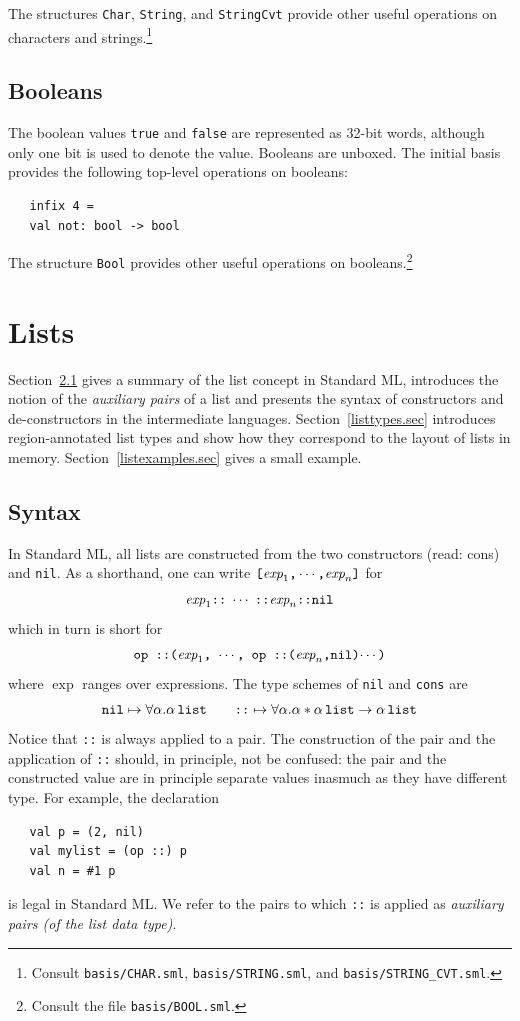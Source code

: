 \documentclass[12pt]{book}
\begin{document}
The structures {\tt Char}, {\tt String}, and {\tt StringCvt} provide other
useful operations on characters and strings.\footnote{Consult {\tt basis/CHAR.sml}, {\tt basis/STRING.sml},
  and {\tt basis/STRING\_CVT.sml}.}

\section{Booleans}
The boolean values {\tt true} and {\tt false} are represented as
32-bit words, although only one bit is used to denote the value.
Booleans are unboxed. The 
%
initial basis provides the following top-level operations on
booleans:
%
%
\begin{verbatim}
   infix 4 =
   val not: bool -> bool
\end{verbatim}
The structure {\tt Bool} provides other useful operations on
booleans.\footnote{Consult the file {\tt basis/BOOL.sml}.}

\chapter{Lists}
\label{lists.sec}
Section~\ref{lsyn.sec} gives a summary of the list concept in Standard
ML, introduces the notion of the {\em auxiliary pairs} of a list and
presents the syntax of constructors and de-constructors in the
intermediate languages.  Section~\ref{listtypes.sec} introduces
region-annotated list types and show how they correspond to the layout
of lists in memory.  Section~\ref{listexamples.sec} gives a small
example.

\section{Syntax}
\label{lsyn.sec}
In Standard ML, all lists are constructed 
from the two constructors 
%
\boxml{::} (read: cons) and 
%
{\tt nil}.  As a shorthand, one can write
$\hbox{\tt [}\hbox{\it exp}_1\hbox{\tt ,}\cdots \hbox{\tt ,}\hbox{\it exp}_n\hbox{\tt ]}$ for
$$ \hbox{\it exp}_1\hbox{\tt ::}\; \cdots\; \hbox{\tt ::} \hbox{\it exp}_n\hbox{\tt ::}\hbox{\tt nil}$$
which in turn is short for
$$
\hbox{\tt op ::($\hbox{\it exp}_1$, $\cdots$, op ::($\hbox{\it exp}_n$,nil)$\cdots$)}$$
where $\exp$ ranges over expressions.  The type schemes of {\tt nil}
and {\tt cons} are
$$\hbox{\tt nil}\mapsto\forall\alpha.\alpha\,\hbox{\tt list}\qquad
\hbox{\tt ::} \mapsto\forall\alpha.\alpha\ast\alpha\,\hbox{\tt list}\to\alpha\,\hbox{\tt list}
$$
Notice that {\tt ::} is always applied to a pair. The construction
of the pair and the application of {\tt ::} should, in principle, not
be confused: the pair and the constructed value are in principle
separate values inasmuch as they have different type.  For example,
the declaration
\begin{verbatim}
   val p = (2, nil)
   val mylist = (op ::) p
   val n = #1 p
\end{verbatim}
is legal in Standard ML. We refer to the pairs to which {\tt ::} is
applied as 
%
{\em auxiliary pairs (of the list data type)}.
\end{document}

